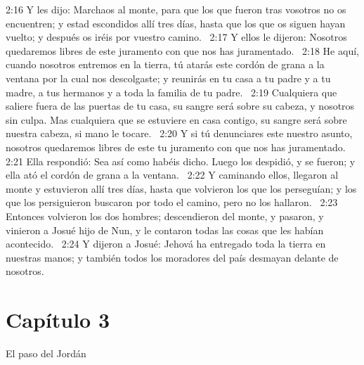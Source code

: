 2:16 Y les dijo: Marchaos al monte, para que los que fueron tras vosotros no os encuentren; y estad escondidos allí tres días, hasta que los que os siguen hayan vuelto; y después os iréis por vuestro camino.  
2:17 Y ellos le dijeron: Nosotros quedaremos libres de este juramento con que nos has juramentado.  
2:18 He aquí, cuando nosotros entremos en la tierra, tú atarás este cordón de grana a la ventana por la cual nos descolgaste; y reunirás en tu casa a tu padre y a tu madre, a tus hermanos y a toda la familia de tu padre.  
2:19 Cualquiera que saliere fuera de las puertas de tu casa, su sangre será sobre su cabeza, y nosotros sin culpa. Mas cualquiera que se estuviere en casa contigo, su sangre será sobre nuestra cabeza, si mano le tocare.  
2:20 Y si tú denunciares este nuestro asunto, nosotros quedaremos libres de este tu juramento con que nos has juramentado.  
2:21 Ella respondió: Sea así como habéis dicho. Luego los despidió, y se fueron; y ella ató el cordón de grana a la ventana.  
2:22 Y caminando ellos, llegaron al monte y estuvieron allí tres días, hasta que volvieron los que los perseguían; y los que los persiguieron buscaron por todo el camino, pero no los hallaron.  
2:23 Entonces volvieron los dos hombres; descendieron del monte, y pasaron, y vinieron a Josué hijo de Nun, y le contaron todas las cosas que les habían acontecido.  
2:24 Y dijeron a Josué: Jehová ha entregado toda la tierra en nuestras manos; y también todos los moradores del país desmayan delante de nosotros.  
\section*{Capítulo 3}
El paso del Jordán  

